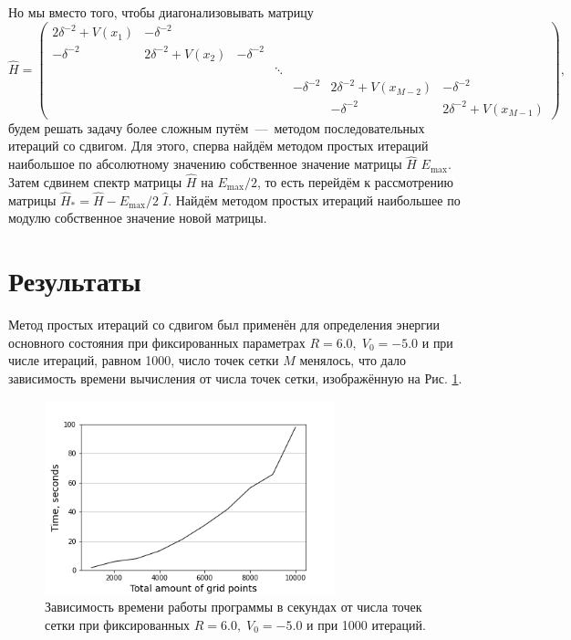\documentclass[10pt]{article}
\begin{document}
Но мы вместо того, чтобы диагонализовывать матрицу
\begin{equation}
 \hat H = \begin{pmatrix}
        2\delta^{-2}+V(x_1)& -\delta^{-2}\\
        -\delta^{-2}& 2\delta^{-2}+V(x_2)& -\delta^{-2}\\
        & & & \ddots&\\
        & & & & -\delta^{-2}& 2\delta^{-2}+V(x_{M-2})& -\delta^{-2}\\
        & & & & & -\delta^{-2}& 2\delta^{-2}+V(x_{M-1})
    \end{pmatrix},
\end{equation}
будем решать задачу более сложным путём~---~методом последовательных итераций со сдвигом. Для этого, сперва найдём методом простых итераций наибольшое по абсолютному значению собственное значение матрицы $\hat H$ $E_\textrm{max}$. Затем сдвинем спектр матрицы $\hat H$ на $E_\textrm{max}/2$, то есть перейдём к рассмотрению матрицы $\hat H_* = \hat H - E_\textrm{max}/2\; \hat I$. Найдём методом простых итераций наибольшее по модулю собственное значение новой матрицы.

\section{Результаты}

Метод простых итераций со сдвигом был применён для определения энергии основного состояния при фиксированных параметрах $R=6.0,\; V_0 = -5.0$ и при числе итераций, равном 1000, число точек сетки $M$ менялось, что дало зависимость времени вычисления от числа точек сетки, изображённую на Рис. \ref{fig:t_vs_m}.
\begin{figure}[htbp]
 \centering
 \includegraphics[width=0.75\textwidth]{../figures/t_vs_m}
 \caption{Зависимость времени работы программы в секундах от числа точек сетки при фиксированных $R=6.0,\; V_0 = -5.0$ и при 1000 итераций.}
 \label{fig:t_vs_m}
\end{figure}
\end{document}

